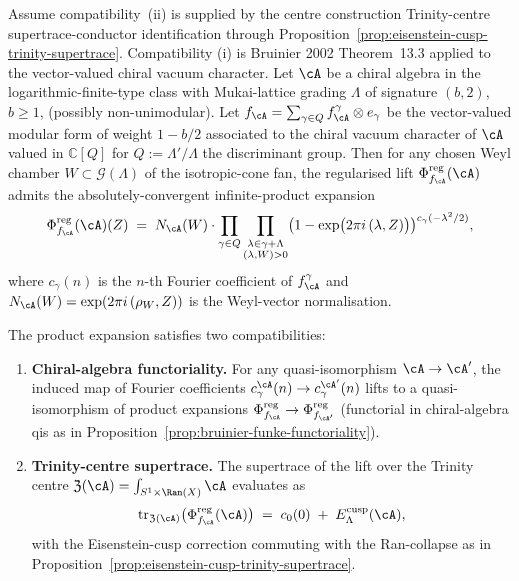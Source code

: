 \begin{proposition}
\label{prop:borcherds-product-non-unimodular}
Assume compatibility~\textup{(ii)} is supplied by the centre construction
Trinity-centre supertrace-conductor identification through
Proposition~\ref{prop:eisenstein-cusp-trinity-supertrace}. Compatibility
\textup{(i)} is Bruinier 2002 Theorem~13.3 applied to the
vector-valued chiral vacuum character. Let $\cA$ be a chiral algebra in
the logarithmic-finite-type class with
Mukai-lattice grading $\Lambda$ of signature $(b, 2)$, $b \ge 1$,
\textup{(}possibly non-unimodular\textup{).} Let
$f_\cA = \sum_{\gamma \in Q} f_\cA^\gamma \otimes e_\gamma$ be the vector-valued
modular form of weight $1 - b/2$ associated to the chiral vacuum character of
$\cA$ valued in $\mathbb{C}[Q]$ for $Q := \Lambda' / \Lambda$ the discriminant
group. Then for any chosen Weyl chamber $W \subset \mathcal{G}(\Lambda)$ of the
isotropic-cone fan, the regularised lift $\Phi^{\mathrm{reg}}_{f_\cA}(\cA)$
admits the absolutely-convergent infinite-product expansion
\[
 \Phi^{\mathrm{reg}}_{f_\cA}(\cA)(Z) \;=\; N_\cA(W) \cdot \prod_{\gamma \in Q} \prod_{\substack{\lambda \in \gamma + \Lambda \\ (\lambda, W) > 0}} \bigl(1 - \exp\bigl(2\pi i\,(\lambda, Z)\bigr)\bigr)^{c_\gamma(-\lambda^2 / 2)},
\]
where $c_\gamma(n)$ is the $n$-th Fourier coefficient of $f_\cA^\gamma$ and
$N_\cA(W) = \exp(2\pi i\,(\rho_W, Z))$ is the Weyl-vector normalisation.

The product expansion satisfies two compatibilities:
\begin{enumerate}[label=\textup{(\roman*)}]
 \item \textbf{Chiral-algebra functoriality.} For any quasi-isomorphism
 $\cA \to \cA'$, the induced map of Fourier coefficients
 $c_\gamma^\cA(n) \to c_\gamma^{\cA'}(n)$ lifts to a quasi-isomorphism
 of product expansions $\Phi^{\mathrm{reg}}_{f_\cA} \to \Phi^{\mathrm{reg}}_{f_{\cA'}}$
 \textup{(}functorial in chiral-algebra qis as in
 Proposition~\ref{prop:bruinier-funke-functoriality}\textup{).}
 \item \textbf{Trinity-centre supertrace.} The supertrace of the lift over
 the Trinity centre $\mathfrak{Z}(\cA) = \int_{S^1 \times \Ran(X)} \cA$
 evaluates as
 \[
 \mathrm{tr}_{\mathfrak{Z}(\cA)}\bigl(\Phi^{\mathrm{reg}}_{f_\cA}(\cA)\bigr)
 \;=\; c_0(0) \;+\; E_\Lambda^{\mathrm{cusp}}(\cA),
 \]
 with the Eisenstein-cusp correction commuting with the Ran-collapse
 as in Proposition~\ref{prop:eisenstein-cusp-trinity-supertrace}.
\end{enumerate}
\end{proposition}

